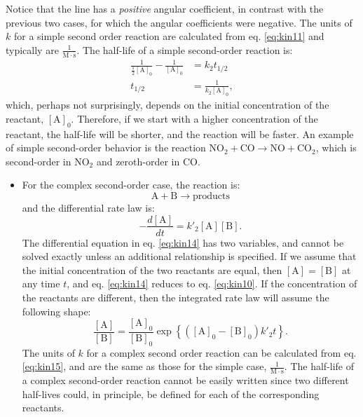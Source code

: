 \documentclass[
  9pt,
]{extbook}
\providecommand{\tightlist}{%
  \setlength{\itemsep}{0pt}\setlength{\parskip}{0pt}}
\theoremstyle{definition}
\theoremstyle{definition}
\theoremstyle{definition}
\theoremstyle{definition}
\theoremstyle{remark}
\begin{document}
Notice that the line has a \emph{positive} angular coefficient, in contrast with the previous two cases, for which the angular coefficients were negative. The units of \(k\) for a simple second order reaction are calculated from eq. \eqref{eq:kin11} and typically are \(\frac{1}{\mathrm{M}\cdot \mathrm{s}}\).
The half-life of a simple second-order reaction is:
\begin{equation}
\begin{aligned}
\frac{1}{\frac{1}{2}[\mathrm{A}]_0}-\frac{1}{[\mathrm{A}]_0} &= k_2 t_{1/2} \\
t_{1/2} &= \frac{1}{k_2 [\mathrm{A}]_0},
\end{aligned}
\label{eq:kin12}
\end{equation}
which, perhaps not surprisingly, depends on the initial concentration of the reactant, \([\mathrm{A}]_0\). Therefore, if we start with a higher concentration of the reactant, the half-life will be shorter, and the reaction will be faster. An example of simple second-order behavior is the reaction \(\mathrm{NO}_2 + \mathrm{CO} \rightarrow \mathrm{NO} + \mathrm{CO}_2\), which is second-order in \(\mathrm{NO}_2\) and zeroth-order in \(\mathrm{CO}\).

\begin{itemize}
\tightlist
\item
  For the complex second-order case, the reaction is:
  \begin{equation}
  \mathrm{A}+\mathrm{B}\rightarrow \text{products}
  \end{equation}
  and the differential rate law is:
  \begin{equation}
  -\frac{d[\mathrm{A}]}{dt}=k'_2 [\mathrm{A}][\mathrm{B}].
  \label{eq:kin14}
  \end{equation}
  The differential equation in eq. \eqref{eq:kin14} has two variables, and cannot be solved exactly unless an additional relationship is specified. If we assume that the initial concentration of the two reactants are equal, then \([\mathrm{A}]=[\mathrm{B}]\) at any time \(t\), and eq. \eqref{eq:kin14} reduces to eq. \eqref{eq:kin10}. If the concentration of the reactants are different, then the integrated rate law will assume the following shape:
  \begin{equation}
  \frac{\mathrm{[A]}}{\mathrm{[B]}} = \frac{\mathrm{[A]_0}}{\mathrm{[B]_0}} \exp \left\{ \left(\mathrm{[A]_0} - \mathrm{[B]_0}\right) k'_2t \right\}.
  \label{eq:kin15}
  \end{equation}
  The units of \(k\) for a complex second order reaction can be calculated from eq. \eqref{eq:kin15}, and are the same as those for the simple case, \(\frac{1}{\mathrm{M}\cdot \mathrm{s}}\).
  The half-life of a complex second-order reaction cannot be easily written since two different half-lives could, in principle, be defined for each of the corresponding reactants.
\end{itemize}
\end{document}
